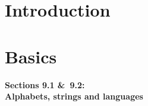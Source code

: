 
\newcommand{\mytitle}{Computational Foundations \\ Sections 9.1-9.2}
\newcommand{\mychpnr}{9}


\section{Introduction}

\section{Basics}

\begin{frame}
\begin{center}
\addtocounter{part}{1}
{\bf Sections 9.1 \&\ 9.2: \\ Alphabets, strings and languages}
\end{center}
\end{frame}

